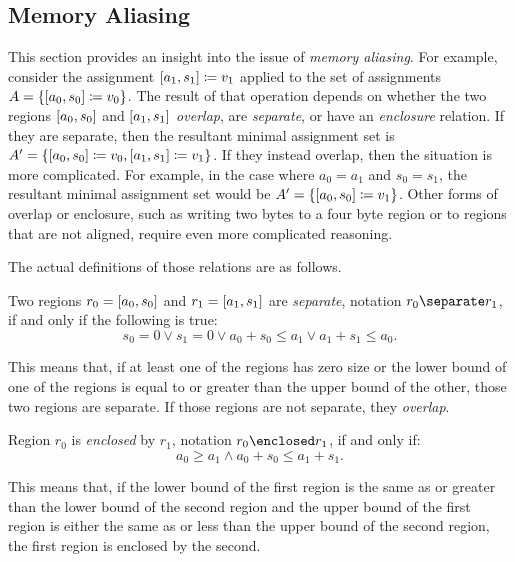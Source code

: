 \subsection{Memory Aliasing}\label{memory_aliasing}
This section provides an insight into the issue of \emph{memory aliasing}.%
For example, consider the assignment $[a_1,s_1]\coloneqq v_1$
applied to the set of assignments $A=\{[a_0,s_0]\coloneqq v_0\}$.
The result of that operation
depends on whether the two regions $[a_0,s_0]$ and $[a_1,s_1]$
\emph{overlap}, are \emph{separate}, or have an \emph{enclosure} relation.%
%
%
If they are separate, then the resultant minimal assignment set is
$A'=\{[a_0,s_0]\coloneqq v_0,[a_1,s_1]\coloneqq v_1\}$.
If they instead overlap, then the situation is more complicated.
For example, in the case where $a_0=a_1$ and $s_0=s_1$,
the resultant minimal assignment set would be $A'=\{[a_0,s_0]\coloneqq v_1\}$.
Other forms of overlap or enclosure, such as writing two bytes to a four byte region
or to regions that are not aligned, require even more complicated reasoning.

The actual definitions of those relations are as follows.
\begin{definition}[Separation]\label{def:sep}
  Two regions $r_0=[a_0,s_0]$ and $r_1=[a_1,s_1]$ are \emph{separate},%
  notation $r_0\separate r_1$, if and only if the following is true:
  \begin{equation*}
    s_0=0\vee s_1=0\vee a_0+s_0\leq a_1\vee a_1+s_1\leq a_0.
  \end{equation*}
\end{definition}
This means that, if at least one of the regions has zero size
or the lower bound of one of the regions is equal to or greater than
the upper bound of the other, those two regions are separate.
If those regions are not separate, they \emph{overlap}.

\begin{definition}[Enclosure]\label{def:enc}
  Region $r_0$ is \emph{enclosed} by $r_1$, notation $r_0\enclosed r_1$,%
  if and only if:
  \begin{equation*}
    a_0\geq a_1\wedge a_0+s_0\leq a_1+s_1.
  \end{equation*}
\end{definition}
This means that, if the lower bound of the first region is the same as
or greater than the lower bound of the second region
and the upper bound of the first region is either the same as or less than
the upper bound of the second region, the first region is enclosed by the second.


